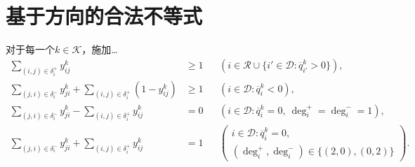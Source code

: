 \documentclass{article}
\begin{document}
\section*{基于方向的合法不等式}
对于每一个$k\in\mathcal K$，施加…
\begin{align}
\sum_{(i,j)\in\delta_i^+}y_{ij}^k&\ge1
&&\left(i\in\mathcal R\cup\{i'\in\mathcal D:\overline q_{i'}^k>0\}\right), \tag{32}\\
\sum_{(j,i)\in\delta_i^-}y_{ji}^k+
\sum_{(i,j)\in\delta_i^+}(1-y_{ij}^k)&\ge1
&&(i\in\mathcal D:\overline q_i^k<0), \tag{33}\\
\sum_{(j,i)\in\delta_i^-}y_{ji}^k-
\sum_{(i,j)\in\delta_i^+}y_{ij}^k&=0
&&(i\in\mathcal D:\overline q_i^k=0,\ \deg_i^+=\deg_i^-=1), \tag{34a}\\
\sum_{(j,i)\in\delta_i^-}y_{ji}^k+
\sum_{(i,j)\in\delta_i^+}y_{ij}^k&=1
&&\left(\begin{array}{l}i\in\mathcal D:\overline q_i^k=0,\\(\deg_i^+,\deg_i^-)\in\{(2,0),(0,2)\}\end{array}\right). \tag{34b}
\end{align}
\end{document}
